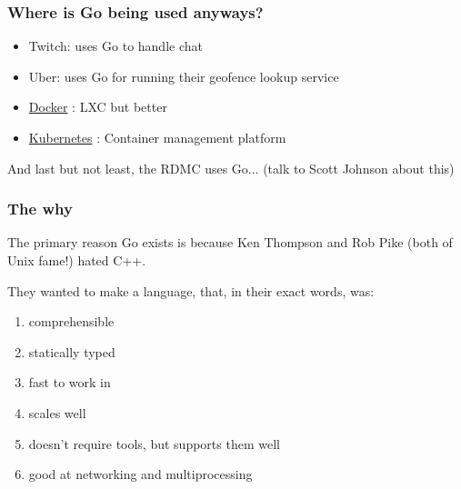 \documentclass{beamer}
\begin{document}

\begin{frame}
\frametitle{Where is Go being used anyways?}


\begin{itemize}
\setlength\itemsep{1.5em}
\item Twitch: uses Go to handle chat \footnotemark
\item Uber: uses Go for running their geofence lookup service \footnotemark 
\item \href{https://www.docker.com/}{Docker} : LXC but better
\item \href{https://kubernetes.io/}{Kubernetes} : Container management platform
\end{itemize}

\vspace{1cm}

And last but not least, the RDMC uses Go... (talk to Scott Johnson about this)


\end{frame}


\begin{frame}
\frametitle{The why}

The primary reason Go exists is because Ken Thompson and Rob Pike (both of Unix fame!) hated C++. \footnotemark

\vspace{0.5cm}

They wanted to make a language, that, in their exact words, was: \footnotemark

\begin{enumerate}
\item comprehensible
\item statically typed
\item fast to work in
\item scales well
\item doesn't require tools, but supports them well
\item good at networking and multiprocessing
\end{enumerate}


\end{frame}
\end{document}
